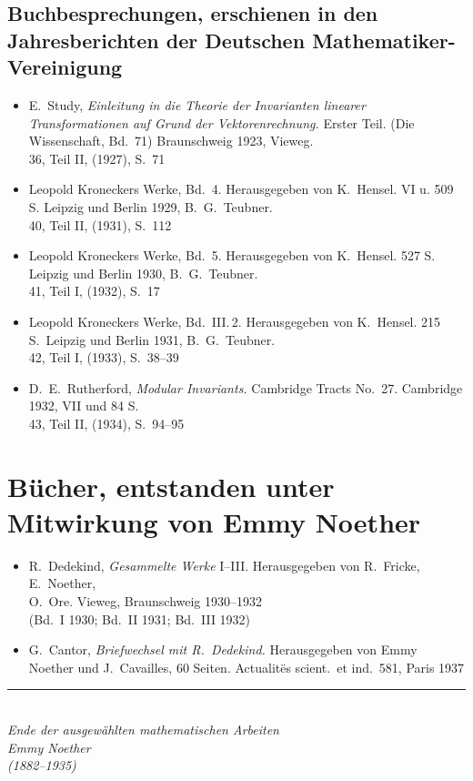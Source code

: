 \documentclass[12pt,a4paper]{article}
\theoremstyle{plain}
\theoremstyle{definition}
\theoremstyle{remark}
\begin{document}
\subsection*{Buchbesprechungen, erschienen in den Jahresberichten der Deutschen Mathematiker-Vereinigung}

\begin{itemize}[leftmargin=1.5em,itemsep=0.2em]
\item E.\ Study, \textit{Einleitung in die Theorie der Invarianten linearer Transformationen
auf Grund der Vektorenrechnung.} Erster Teil. (Die Wissenschaft, Bd.~71)
Braunschweig 1923, Vieweg.\\
36, Teil II, (1927), S.~71

\item Leopold Kroneckers Werke, Bd.~4. Herausgegeben von K.\ Hensel. VI u.
509 S. Leipzig und Berlin 1929, B.\ G.\ Teubner.\\
40, Teil II, (1931), S.~112

\item Leopold Kroneckers Werke, Bd.~5. Herausgegeben von K.\ Hensel. 527 S.
Leipzig und Berlin 1930, B.\ G.\ Teubner.\\
41, Teil I, (1932), S.~17

\item Leopold Kroneckers Werke, Bd.\ III.\,2. Herausgegeben von K.\ Hensel.
215 S.\ Leipzig und Berlin 1931, B.\ G.\ Teubner.\\
42, Teil I, (1933), S.~38--39

\item D.\ E.\ Rutherford, \textit{Modular Invariants.} Cambridge Tracts No.~27.
Cambridge 1932, VII und 84 S.\\
43, Teil II, (1934), S.~94--95
\end{itemize}

\newpage
\section*{B\"ucher, entstanden unter Mitwirkung von Emmy Noether}

\begin{itemize}[leftmargin=1.5em,itemsep=0.5em]
\item R.\ Dedekind, \textit{Gesammelte Werke} I--III. Herausgegeben von R.\ Fricke,
E.\ Noether, \\O.\ Ore. Vieweg, Braunschweig 1930--1932\\
(Bd.~I 1930; Bd.~II 1931; Bd.~III 1932)

\item G.\ Cantor, \textit{Briefwechsel mit R.\ Dedekind.} Herausgegeben von Emmy
Noether und J.\ Cavailles, 60 Seiten. Actualit\"es scient.\ et ind.\ 581,
Paris 1937
\end{itemize}

\vfill

\begin{center}
\rule{0.5\textwidth}{0.4pt}\\[1em]
\textit{Ende der ausgewählten mathematischen Arbeiten}\\[0.5em]
\textit{Emmy Noether}\\[0.5em]
\textit{(1882--1935)}
\end{center}
\end{document}
